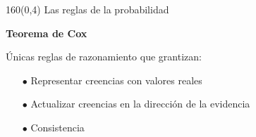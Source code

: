 \documentclass[shownotes,aspectratio=169]{beamer}
\begin{document}
 \begin{frame}[plain]
 \begin{textblock}{160}(0,4)
  \centering \LARGE Las reglas de la probabilidad
 \end{textblock}
 
 
\vspace{1.2cm}
 
  \textbf{Teorema de Cox} \\ 
  
  \vspace{0.3cm}
  
  \'Unicas reglas de razonamiento que grantizan:
\begin{itemize}
 \item[$\bullet$] Representar creencias con valores reales 
 \item[$\bullet$] Actualizar creencias en la direcci\'on de la evidencia
 \item[$\bullet$] Consistencia
 \end{itemize}
 
 
%  
 \end{frame}
 
\end{document}
